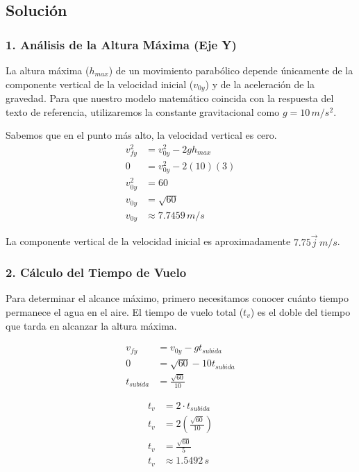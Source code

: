 \documentclass[12pt, a4paper]{article}
\begin{document}
\subsection*{Solución}

\subsubsection*{1. Análisis de la Altura Máxima (Eje Y)}
La altura máxima ($h_{max}$) de un movimiento parabólico depende únicamente de la componente vertical de la velocidad inicial ($v_{0y}$) y de la aceleración de la gravedad. Para que nuestro modelo matemático coincida con la respuesta del texto de referencia, utilizaremos la constante gravitacional como $g = 10 \, \si{m/s^2}$. 

Sabemos que en el punto más alto, la velocidad vertical es cero.
\begin{align*}
v_{fy}^2 &= v_{0y}^2 - 2g h_{max} \\
0 &= v_{0y}^2 - 2(10)(3) \\
v_{0y}^2 &= 60 \\
v_{0y} &= \sqrt{60} \\
v_{0y} &\approx 7.7459 \, \si{m/s}
\end{align*}

La componente vertical de la velocidad inicial es aproximadamente $7.75\vec{j} \, \si{m/s}$.

\subsubsection*{2. Cálculo del Tiempo de Vuelo}
Para determinar el alcance máximo, primero necesitamos conocer cuánto tiempo permanece el agua en el aire. El tiempo de vuelo total ($t_v$) es el doble del tiempo que tarda en alcanzar la altura máxima.

\begin{align*}
v_{fy} &= v_{0y} - g t_{subida} \\
0 &= \sqrt{60} - 10 t_{subida} \\
t_{subida} &= \frac{\sqrt{60}}{10}
\end{align*}

\begin{align*}
t_v &= 2 \cdot t_{subida} \\
t_v &= 2 \left(\frac{\sqrt{60}}{10}\right) \\
t_v &= \frac{\sqrt{60}}{5} \\
t_v &\approx 1.5492 \, \si{s}
\end{align*}
\end{document}
